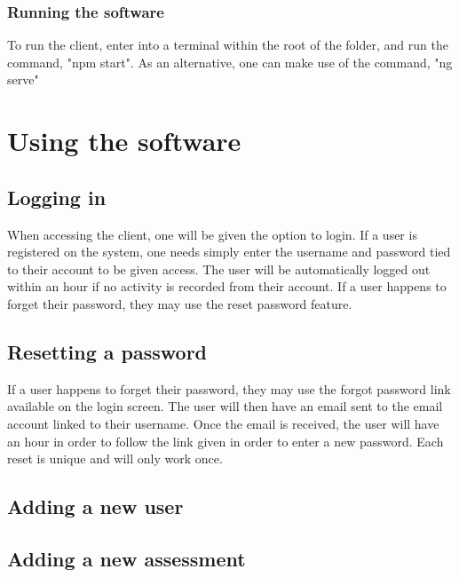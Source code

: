 \documentclass[a4paper,12pt]{article}
\begin{document}
     		\subsubsection {Running the software}
     		
	     	To run the client, enter into a terminal within the root of the folder, and run the command, "npm start". As an alternative, one can make use of the command, "ng serve"
    
    \pagebreak
    
    \section{Using the software}
    
    	\subsection{Logging in}
    	
    	When accessing the client, one will be given the option to login. If a user is registered on the system, one needs simply enter the username and password tied to their account to be given access. The user will be automatically logged out within an hour if no activity is recorded from their account. If a user happens to forget their password, they may use the reset password feature.
    	
   		\subsection{Resetting a password}
    	
    	If a user happens to forget their password, they may use the forgot password link available on the login screen. The user will then have an email sent to the email account linked to their username. Once the email is received, the user will have an hour in order to follow the link given in order to enter a new password. Each reset is unique and will only work once.
    	
    	\subsection{Adding a new user}
    	
    	\subsection{Adding a new assessment}
    
\end{document}
